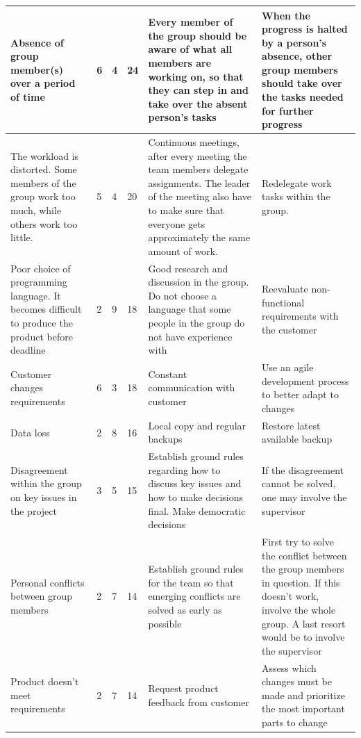 \begin{appendices}
\begin{longtable}{ | p{3.5cm} | p{2cm} | p{1.5cm} | p{2cm} | p{3.5cm} | p{3.5cm} |}
	Absence of group member(s) over a period of time & 6 & 4 & 24 & Every member of the group should be aware of what all members are working on, so that they can step in and take over the absent person's tasks & When the progress is halted by a person's absence, other group members should take over the tasks needed for further progress \\ \hline
	
	The workload is distorted. Some members of the group work too much, while others work too little. & 5 & 4 & 20 & Continuous meetings, after every meeting the team members delegate assignments. The leader of the meeting also have to make sure that everyone gets approximately the same amount of work. & Redelegate work tasks within the group. \\ \hline
	
	Poor choice of programming language. It becomes difficult to produce the product before deadline & 2 & 9 & 18 & Good research and discussion in the group. Do not choose a language that some people in the group do not have experience with & Reevaluate non-functional requirements with the customer \\ \hline
	
	Customer changes requirements & 6 & 3 & 18 & Constant communication with customer & Use an agile development process to better adapt to changes \\ \hline
	
	Data loss & 2 & 8 & 16 & Local copy and regular backups & Restore latest available backup \\ \hline
	
	Disagreement within the group on key issues in the project & 3 & 5 & 15 & Establish ground rules regarding how to discuss key issues and how to make decisions final. Make democratic decisions & If the disagreement cannot be solved, one may involve the supervisor \\ \hline
	
	Personal conflicts between group members & 2 & 7 & 14 & Establish ground rules for the team so that emerging conflicts are solved as early as possible & First try to solve the conflict between the group members in question. If this doesn't work, involve the whole group. A last resort would be to involve the supervisor \\ \hline
	
	Product doesn't meet requirements & 2 & 7 & 14 & Request product feedback from customer & Assess which changes must be made and prioritize the most important parts to change \\ \hline
	

\end{longtable}
\end{appendices}
